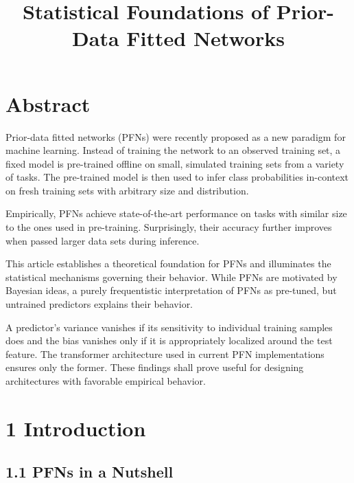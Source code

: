 \documentclass[aspectratio=169,10pt]{beamer}
\title{Statistical Foundations of Prior-Data Fitted Networks}
\subtitle{}
\author{\cit{Nagler '23}}
\date{}
\newcommand{\currentheading}{\ifx\insertsubsection\empty\insertsection\else\insertsubsection\fi}
\begin{document}
\maketitle

\section{Abstract}

\begin{frame}{\currentheading}
Prior-data fitted networks (PFNs) were recently proposed as a new paradigm for machine learning. Instead of training the network to an observed training set, a fixed model is pre-trained offline on small, simulated training sets from a variety of tasks. The pre-trained model is then used to infer class probabilities in-context on fresh training sets with arbitrary size and distribution.
\end{frame}

\begin{frame}{\currentheading}
Empirically, PFNs achieve state-of-the-art performance on tasks with similar size to the ones used in pre-training. Surprisingly, their accuracy further improves when passed larger data sets during inference.

This article establishes a theoretical foundation for PFNs and illuminates the statistical mechanisms governing their behavior. While PFNs are motivated by Bayesian ideas, a purely frequentistic interpretation of PFNs as pre-tuned, but untrained predictors explains their behavior.

A predictor's variance vanishes if its sensitivity to individual training samples does and the bias vanishes only if it is appropriately localized around the test feature. The transformer architecture used in current PFN implementations ensures only the former. These findings shall prove useful for designing architectures with favorable empirical behavior.
\end{frame}

\section{1 Introduction}
\subsection{1.1 PFNs in a Nutshell}
\end{document}
